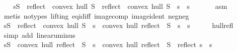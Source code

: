\begin{isabellebody}
\ \ \isamarkupfalse%
\ {}{\isacharcolon}{\kern0pt}{\isachardoublequoteopen}s{\isasymin}S\ {\isasymlongrightarrow}\ reflect\ {\isacharbackquote}{\kern0pt}\ {\isacharparenleft}{\kern0pt}convex\ hull\ S{\isacharparenright}{\kern0pt}\ {\isasymnoteq}\ {\isacharparenleft}{\kern0pt}reflect\ {\isacharbackquote}{\kern0pt}\ {\isacharparenleft}{\kern0pt}convex\ hull\ {\isacharparenleft}{\kern0pt}S\ {\isacharminus}{\kern0pt}\ {\isacharbraceleft}{\kern0pt}s{\isacharbraceright}{\kern0pt}{\isacharparenright}{\kern0pt}{\isacharparenright}{\kern0pt}{\isacharparenright}{\kern0pt}{\isachardoublequoteclose}\ \ s\isanewline
\ \ \ \ \isamarkupfalse%
\ \ asm\ \isamarkupfalse%
\ {\isacharparenleft}{\kern0pt}metis\ {\isacharparenleft}{\kern0pt}no{\isacharunderscore}{\kern0pt}types{\isacharcomma}{\kern0pt}\ lifting{\isacharparenright}{\kern0pt}\ eq{\isacharunderscore}{\kern0pt}id{\isacharunderscore}{\kern0pt}iff\ image{\isacharunderscore}{\kern0pt}comp\ image{\isacharunderscore}{\kern0pt}ident\ neg{\isacharunderscore}{\kern0pt}neg{\isacharparenright}{\kern0pt}\isanewline
\ \ \isamarkupfalse%
\ {}{\isacharcolon}{\kern0pt}{\isachardoublequoteopen}s{\isasymin}S\ {\isasymlongrightarrow}\ {\isacharparenleft}{\kern0pt}reflect\ {\isacharbackquote}{\kern0pt}\ {\isacharparenleft}{\kern0pt}convex\ hull\ {\isacharparenleft}{\kern0pt}S\ {\isacharminus}{\kern0pt}\ {\isacharbraceleft}{\kern0pt}s{\isacharbraceright}{\kern0pt}{\isacharparenright}{\kern0pt}{\isacharparenright}{\kern0pt}{\isacharparenright}{\kern0pt}\ {\isacharequal}{\kern0pt}\ {\isacharparenleft}{\kern0pt}convex\ hull\ {\isacharparenleft}{\kern0pt}reflect\ {\isacharbackquote}{\kern0pt}\ {\isacharparenleft}{\kern0pt}S\ {\isacharminus}{\kern0pt}\ {\isacharbraceleft}{\kern0pt}s{\isacharbraceright}{\kern0pt}{\isacharparenright}{\kern0pt}{\isacharparenright}{\kern0pt}{\isacharparenright}{\kern0pt}{\isachardoublequoteclose}\ \ s\isanewline
\ \ \ \ \isamarkupfalse%
\ hull{\isacharunderscore}{\kern0pt}refl\ \isamarkupfalse%
\ {\isacharparenleft}{\kern0pt}simp\ add{\isacharcolon}{\kern0pt}\ linear{\isacharunderscore}{\kern0pt}uminus{\isacharparenright}{\kern0pt}\isanewline
\ \ \isamarkupfalse%
\ {}{\isacharcolon}{\kern0pt}{\isachardoublequoteopen}s{\isasymin}S\ {\isasymlongrightarrow}\ {\isacharparenleft}{\kern0pt}convex\ hull\ {\isacharparenleft}{\kern0pt}reflect\ {\isacharbackquote}{\kern0pt}\ {\isacharparenleft}{\kern0pt}S\ {\isacharminus}{\kern0pt}\ {\isacharbraceleft}{\kern0pt}s{\isacharbraceright}{\kern0pt}{\isacharparenright}{\kern0pt}{\isacharparenright}{\kern0pt}{\isacharparenright}{\kern0pt}\ {\isacharequal}{\kern0pt}\ convex\ hull\ {\isacharparenleft}{\kern0pt}reflect\ {\isacharbackquote}{\kern0pt}\ S\ {\isacharminus}{\kern0pt}\ {\isacharbraceleft}{\kern0pt}reflect\ s{\isacharbraceright}{\kern0pt}{\isacharparenright}{\kern0pt}{\isachardoublequoteclose}\ \ s\isanewline

\end{isabellebody}
